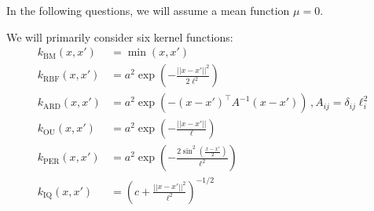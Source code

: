\documentclass[11pt]{article}
\begin{document}
In the following questions, we will assume a mean function $\mu = 0$.

We will primarily consider six kernel functions:
\begin{align}
k_{\text{BM}}(x,x') &= \min (x, x') \\
k_{\text{RBF}}(x,x') &=  a^2 \exp(-\frac{||x-x'||^2}{2\ell^2}) \\
k_{\text{ARD}}(x,x') &= a^2 \exp(-(x-x')^{\top} A^{-1} (x-x')) \,, A_{ij} = \delta_{ij} \ell_i^{2} \\
k_{\text{OU}}(x,x') &= a^2 \exp(-\frac{||x-x'||}{\ell}) \\
k_{\text{PER}}(x,x') &= a^2 \exp(-\frac{2\sin^2(\frac{x-x'}{2})}{\ell^2}) \\
k_{\text{IQ}}(x,x') &= (c + \frac{||x - x'||^2}{\ell^2})^{-1/2}
\end{align}

\end{document}
